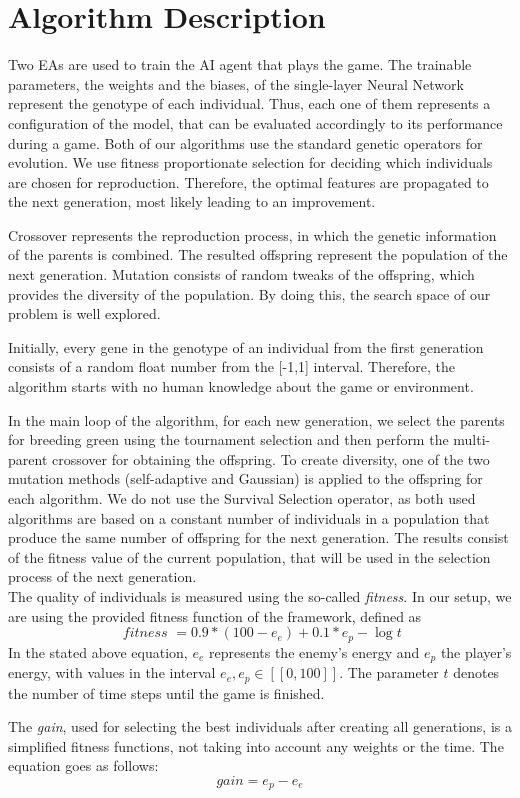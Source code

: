 \section{Algorithm Description}

Two EAs are used to train the AI agent that plays the game. The trainable parameters, the weights and the biases, of the single-layer Neural Network represent the genotype of each individual. Thus, each one of them represents a configuration of the model, that can be evaluated accordingly to its performance during a game. 
Both of our algorithms use the standard genetic operators for evolution. We use fitness proportionate selection for deciding which individuals are chosen for reproduction. Therefore, the optimal features are propagated to the next generation, most likely leading to an improvement.

Crossover represents the reproduction process, in which the genetic information of the parents is combined. The resulted offspring represent the population of the next generation.
Mutation consists of random tweaks of the offspring, which provides the diversity of the population. By doing this, the search space of our problem is well explored. 

Initially, every gene in the genotype of an individual from the first generation consists of a random float number from the [-1,1] interval. Therefore, the algorithm starts with no human knowledge about the game or environment.

In the main loop of the algorithm, for each new generation, we select the parents for breeding green using the tournament selection and then perform the multi-parent crossover for obtaining the offspring. To create diversity, one of the two mutation methods (self-adaptive and Gaussian) is applied to the offspring for each algorithm. We do not use the Survival Selection operator, as both used algorithms are based on a constant number of individuals in a population that produce the same number of offspring for the next generation. The results consist of the fitness value of the current population, that will be used in the selection process of the next generation.
\\
The quality of individuals is measured using the so-called \emph{fitness}. In our setup, we are using the provided fitness function of the framework, defined as
\begin{equation}
\label{fitness}
\textit { fitness }=0.9 *\left(100-e_{e}\right)+0.1 * e_{p}-\log t
\end{equation}
In the stated above equation, $e_e$ represents the enemy's energy and $e_p$ the player's energy, with values in the interval $e_e, e_p \in [[0, 100]]$. The parameter $t$ denotes the number of time steps until the game is finished.

The \emph{gain}, used for selecting the best individuals after creating all generations, is a simplified fitness functions, not taking into account any weights or the time. The equation goes as follows:
\begin{equation}
\label{gain}
    \textit{gain} = e_p - e_e
\end{equation}